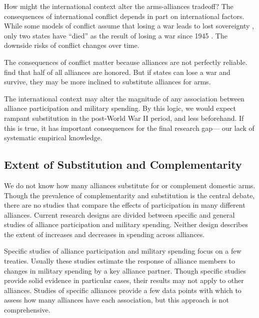 \documentclass[12pt]{article}
\begin{document}
How might the international context alter the arms-alliances tradeoff?
The consequences of international conflict depends in part on international factors. 
While some models of conflict assume that losing a war leads to lost sovereignty \citep{Fearon2018}, only two states have ``died'' as the result of losing a war since 1945 \citep{Fazal2011}. 
The downside risks of conflict changes over time. 


The consequences of conflict matter because alliances are not perfectly reliable. 
\citet{BerkemeierFuhrmann2018} find that half of all alliances are honored. 
But if states can lose a war and survive, they may be more inclined to substitute alliances for arms. 


The international context may alter the magnitude of any association between alliance participation and military spending. 
By this logic, we would expect rampant substitution in the post-World War II period, and less beforehand. 
If this is true, it has important consequences for the final research gap--- our lack of systematic empirical knowledge. 



\subsection{Extent of Substitution and Complementarity}


We do not know how many alliances substitute for or complement domestic arms.
Though the prevalence of complementarity and substitution is the central debate, there are no studies that compare the effects of participation in many different alliances. 
Current research designs are divided between specific and general studies of alliance participation and military spending.
Neither design describes the extent of increases and decreases in spending across alliances.  


Specific studies of alliance participation and military spending focus on a few treaties. 
Usually these studies estimate the response of alliance members to changes in military spending by a key alliance partner. 
Though specific studies provide solid evidence in particular cases, their results may not apply to other alliances. 
Studies of specific alliances provide a few data points with which to assess how many alliances have each association, but this approach is not comprehensive. 
\end{document}

